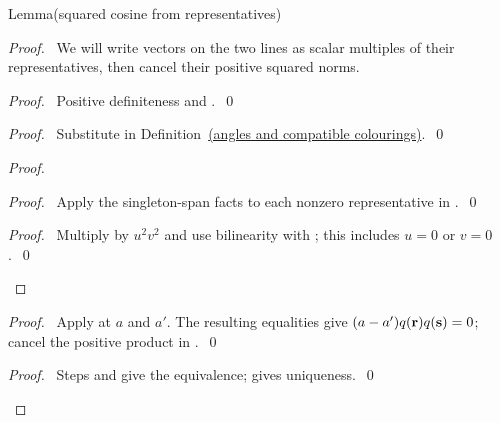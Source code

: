 \begin{mergedproofsection}
\begin{namedresult}{Lemma}{(squared cosine from representatives)}\label{lem:312-squared-cosine}
\end{namedresult}
\begin{proof}
\pfsketch\ We will write vectors on the two lines as scalar multiples
of their representatives, then cancel their positive squared norms.
\begin{proof}\pf\ Positive definiteness and .~\qed\end{proof}
\begin{proof}\pf\ Substitute  in Definition~\hyperref[def:312-angles]{(angles and compatible colourings)}.~\qed\end{proof}
\begin{proof}
 \begin{proof}\pf\ Apply the singleton-span facts to each nonzero
 representative in .~\qed\end{proof}
 \qedstep
 \begin{proof}\pf\ Multiply  by $u^2v^2$ and use bilinearity
 with ; this includes $u=0$ or $v=0$.~\qed\end{proof}
\end{proof}
\begin{proof}\pf\ Apply  at $a$ and $a'$.
The resulting equalities give
$(a-a')q({\mathbf r})q({\mathbf s})=0$; cancel the positive product in
.~\qed\end{proof}
\qedstep
\begin{proof}\pf\ Steps  and 
give the equivalence;  gives uniqueness.~\qed\end{proof}
\end{proof}


\end{mergedproofsection}
